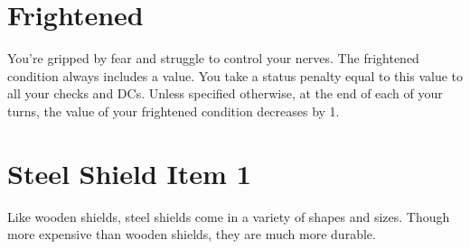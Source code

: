 \documentclass[paper=63mm:88mm, DIV=21, fontsize=7.5pt]{scrartcl}
\begin{document}
\pagestyle{empty}



\setlength\parindent{0pt} %
\setlength\parskip{4pt} %


\renewcommand*{\sectionformat}{}
\renewcommand*{\subsectionformat}{}

\newcommand{\Item}[2]{\section{#2 \hfill Item #1}}
\newcommand{\Action}[4]{\subsection[#4]{#4 \ActionSymbol{#3} \hfill \Reference{#1}{#2}}}

\newcommand{\Requirements}[1]{\paragraph{Requirements} #1.}

\newcommand{\Attribute}[2]{{\engschrift #1 #2}}
\newcommand{\WeaponDamage}[1]{\Attribute{Damage}{#1}}
\newcommand{\ItemHands}[1]{\Attribute{Hands}{#1}}
\newcommand{\ItemBulk}[1]{\Attribute{Bulk}{#1}}
\newcommand{\ItemPrice}[1]{\Attribute{Price}{#1}}
\newcommand{\WeaponType}[1]{\Attribute{Type}{#1}}
\newcommand{\WeaponCategory}[1]{\Attribute{Category}{#1}}
\newcommand{\WeaponGroup}[1]{\Attribute{Group}{#1}}
\newcommand{\Flavor}[1]{\textit{#1}}

\newcommand{\Reference}[2]{{\small #1 #2}}
\newcommand{\DamageType}[1]{\operatorname{\mbox{#1}}}


\section{Frightened}

You're gripped by fear and struggle to control your nerves.
The frightened condition always includes a value.
You take a status penalty equal to this value to all your checks and DCs.
Unless specified otherwise, at the end of each of your turns, the value of your frightened condition decreases by 1.

\Item{1}{Steel Shield}

Like wooden shields, steel shields come in a variety of shapes and sizes. Though more expensive than wooden shields, they are much more durable.
\end{document}
